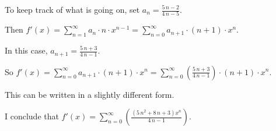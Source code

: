 \documentclass{ximera}
\begin{document}
\begin{question}
\begin{solution}
\begin{hint}
    \end{hint}
    \begin{hint}
      To keep track of what is going on, set \(a_{n} = \displaystyle\frac{5 \, n - 2}{4 \, n - 5}\).
    \end{hint}
    \begin{hint}
      Then \(f'(x) = \displaystyle\sum_{n=1}^\infty a_{n} \cdot n \cdot x^{n-1} =  \displaystyle\sum_{n=0}^\infty a_{n+1} \cdot \left(n+1\right) \cdot x^{n}\).
    \end{hint}
    \begin{hint}
      In this case, \(a_{n+1} = \displaystyle\frac{5 \, n + 3}{4 \, n - 1}\).
    \end{hint}
    \begin{hint}
      So \(f'(x) = \displaystyle\sum_{n=0}^\infty a_{n+1} \cdot \left(n+1\right) \cdot x^{n} = \displaystyle\sum_{n=0}^\infty \left( \displaystyle\frac{5 \, n + 3}{4 \, n - 1} \right) \cdot \left(n+1\right) \cdot x^{n}\).
    \end{hint}
    \begin{hint}
      This can be written in a slightly different form.
    \end{hint}
    \begin{hint}
      I conclude that \(f'(x) = \displaystyle\sum_{n=0}^\infty \left( \displaystyle\frac{{\left(5 \, n^{2} + 8 \, n + 3\right)} x^{n}}{4 \, n - 1} \right) \).
    \end{hint}

    
    \begin{multiple-choice}
    \end{multiple-choice}

  \end{solution}
\end{question}
\end{document}
